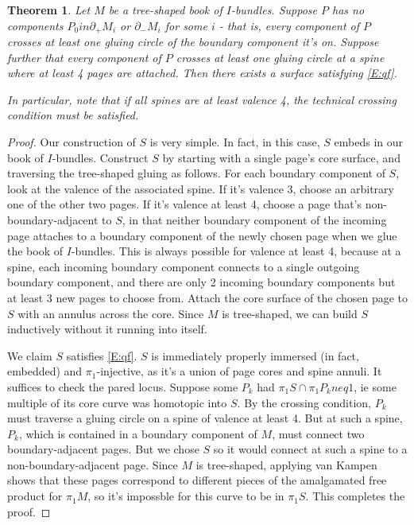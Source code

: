 \documentclass[12pt]{amsart}
\newtheorem{thm}[theorem]{Theorem}
\theoremstyle{definition}
\newcommand{\bd}{\partial}
\begin{document}
\begin{thm}

Let $M$ be a tree-shaped book of $I$-bundles. Suppose $P$ has no components $P_0
in \bd_+M_i$ or $\bd_-M_i$ for some $i$ - that is, every component of $P$
crosses at least one gluing circle of the boundary component it's on. Suppose
further that every component of $P$ crosses at least one gluing circle at
a spine where at least 4 pages are attached. Then there exists a surface
satisfying \eqref{E:qf}.

In particular, note that if all spines are at least valence 4, the technical
crossing condition must be satisfied.

\end{thm}
\begin{proof}

Our construction of $S$ is very simple. In fact, in this case, $S$ embeds in
our book of $I$-bundles. Construct $S$ by starting with a single page's core
surface, and traversing the tree-shaped gluing as follows. For each boundary
component of $S$, look at the valence of the associated spine. If it's valence
3, choose an arbitrary one of the other two pages. If it's valence at least 4,
choose a page that's non-boundary-adjacent to $S$, in that neither boundary
component of the incoming page attaches to a boundary component of the newly
chosen page when we glue the book of $I$-bundles. This is always possible for
valence at least 4, because at a spine, each incoming boundary component
connects to a single outgoing boundary component, and there are only 2 incoming
boundary components but at least 3 new pages to choose from. Attach the core
surface of the chosen page to $S$ with an annulus across the core. Since $M$ is
tree-shaped, we can build $S$ inductively without it running into itself.

We claim $S$ satisfies \eqref{E:qf}. $S$ is immediately properly immersed (in
fact, embedded) and $\pi_1$-injective, as it's a union of page cores and spine
annuli. It suffices to check the pared locus. Suppose some $P_k$ had $\pi_1S
\cap \pi_1P_k neq 1$, ie some multiple of its core curve was homotopic into
$S$. By the crossing condition, $P_k$ must traverse a gluing circle on a spine
of valence at least 4.  But at such a spine, $P_k$, which is contained in
a boundary component of $M$, must connect two boundary-adjacent pages. But we
chose $S$ so it would connect at such a spine to a non-boundary-adjacent page.
Since $M$ is tree-shaped, applying van Kampen shows that these pages correspond
to different pieces of the amalgamated free product for $\pi_1M$, so it's
impossble for this curve to be in $\pi_1S$. This completes the proof.

\end{proof}
\end{document}
